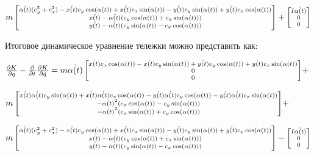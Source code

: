 \documentclass[fleqn, a4paper, 12pt, russian]{article}
\begin{document}
$\scriptsize{m\begin{bmatrix}
	\ddot{\alpha(t)}(c_y^2+c_x^2)-
	\ddot{x(t)}c_y\cos(\alpha(t))+ 
	\ddot{x(t)}c_x\sin(\alpha(t))-
	\ddot{y(t)}c_y\sin(\alpha(t))+ 
	\ddot{y(t)}c_x\cos(\alpha(t))\\
	\ddot{x(t)}
	-\ddot{\alpha(t)}(c_y\cos(\alpha(t))+ c_x\sin(\alpha(t)))\\
	\ddot{y(t)}
	-\ddot{\alpha(t)}(c_y\sin(\alpha(t))- c_x\cos(\alpha(t)))
	\end{bmatrix}+\begin{bmatrix}
I\ddot{\alpha(t)}\\0\\0
\end{bmatrix}}$

\newpage

Итоговое динамическое уравнение тележки можно представить как:

$\scriptsize{\frac{\partial K}{\partial q} - \frac{\partial }{\partial t}\frac{\partial K}{\partial \dot{q}}=
m\dot{\alpha(t)}\begin{bmatrix}
\dot{x(t)}c_x\cos(\alpha(t))-\dot{x(t)}c_y\sin(\alpha(t))+\dot{y(t)}c_y\cos(\alpha(t))+ \dot{y(t)}c_x\sin(\alpha(t))\\0\\0
\end{bmatrix}}+$

$\scriptsize{m\begin{bmatrix}
	\dot{x(t)}\dot{\alpha(t)}c_y\sin(\alpha(t))
	+\dot{x(t)}\dot{\alpha(t)}c_x\cos(\alpha(t))
	-\dot{y(t)}\dot{\alpha(t)}c_y\cos(\alpha(t))
	-\dot{y(t)}\dot{\alpha(t)}c_x\sin(\alpha(t))\\
	-\dot{\alpha(t)}^2(c_x\cos(\alpha(t))-c_y\sin(\alpha(t)))\\
	-\dot{\alpha(t)}^2(c_x\sin(\alpha(t))+c_y\cos(\alpha(t)))
	\end{bmatrix}}+
$

$\scriptsize{m\begin{bmatrix}
	\ddot{\alpha(t)}(c_y^2+c_x^2)-
	\ddot{x(t)}c_y\cos(\alpha(t))+ 
	\ddot{x(t)}c_x\sin(\alpha(t))-
	\ddot{y(t)}c_y\sin(\alpha(t))+ 
	\ddot{y(t)}c_x\cos(\alpha(t))\\
	\ddot{x(t)}
	-\ddot{\alpha(t)}(c_y\cos(\alpha(t))+ c_x\sin(\alpha(t)))\\
	\ddot{y(t)}
	-\ddot{\alpha(t)}(c_y\sin(\alpha(t))- c_x\cos(\alpha(t)))
	\end{bmatrix}-\begin{bmatrix}
	I\ddot{\alpha(t)}\\0\\0
	\end{bmatrix}}$
\end{document}
